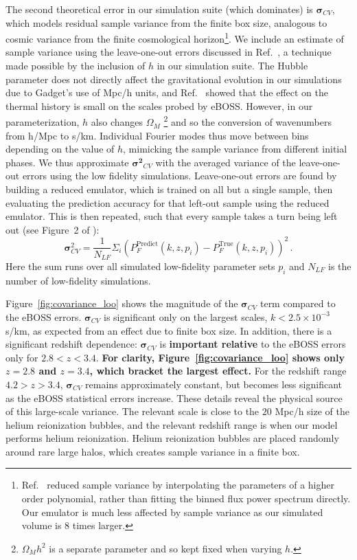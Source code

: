 The second theoretical error in our simulation suite (which dominates) is $\boldsymbol{\sigma}_{CV}$, which models residual sample variance from the finite box size, analogous to cosmic variance from the finite cosmological horizon\footnote{Ref.~\cite{2023ApJ...944..223P} reduced sample variance by interpolating the parameters of a higher order polynomial, rather than fitting the binned flux power spectrum directly.
Our emulator is much less affected by sample variance as our simulated volume is $8$ times larger.}.
We include an estimate of sample variance using the leave-one-out errors discussed in Ref.~\cite{2023simsuite}, a technique made possible by the inclusion of $h$ in our simulation suite.
The Hubble parameter does not directly affect the gravitational evolution in our simulations due to Gadget's use of Mpc/h units, and Ref.~\cite{2023simsuite} showed that the effect on the thermal history is small on the scales probed by eBOSS.
However, in our parameterization, $h$ also changes $\Omega_M$ \footnote{$\Omega_M h^2$ is a separate parameter and so kept fixed when varying $h$.} and so the conversion of wavenumbers from h/Mpc to s/km.
Individual Fourier modes thus move between bins depending on the value of $h$, mimicking the sample variance from different initial phases.
We thus approximate $\boldsymbol{\sigma^2}_{CV}$ with the averaged variance of the leave-one-out errors using the low fidelity simulations.
Leave-one-out errors are found by building a reduced emulator, which is trained on all but a single sample, then evaluating the prediction accuracy for that left-out sample using the reduced emulator.
This is then repeated, such that every sample takes a turn being left out (see Figure~2 of \cite{2023simsuite}):
\begin{equation}
    \boldsymbol{\sigma}^2_{CV}  = \frac{1}{N_{LF}}\Sigma_i \left(P_F^\mathrm{Predict}(k, z, p_i) - P_F^\mathrm{True}(k, z, p_i)\right)^2\,.
\end{equation}
Here the sum runs over all simulated low-fidelity parameter sets $p_i$ and $N_{LF}$ is the number of low-fidelity simulations.

Figure~\ref{fig:covariance_loo} shows the magnitude of the $\boldsymbol{\sigma}_{CV}$ term compared to the eBOSS errors.
$\boldsymbol{\sigma}_{CV}$ is significant only on the largest scales, $k < 2.5 \times 10^{-3}$ s/km, as expected from an effect due to finite box size.
In addition, there is a significant redshift dependence: $\boldsymbol{\sigma}_{CV}$ is \textbf{important relative} to the eBOSS errors only for $2.8 < z < 3.4$.
\textbf{For clarity, Figure~\ref{fig:covariance_loo} shows only $z=2.8$ and $z=3.4$, which bracket the largest effect.} For the redshift range $4.2 > z>3.4$, $\boldsymbol{\sigma}_{CV}$ remains approximately constant, but becomes less significant as the eBOSS statistical errors increase.
These details reveal the physical source of this large-scale variance.
The relevant scale is close to the $20$ Mpc/h size of the helium reionization bubbles, and the relevant redshift range is when our model performs helium reionization.
Helium reionization bubbles are placed randomly around rare large halos, which creates sample variance in a finite box. 

